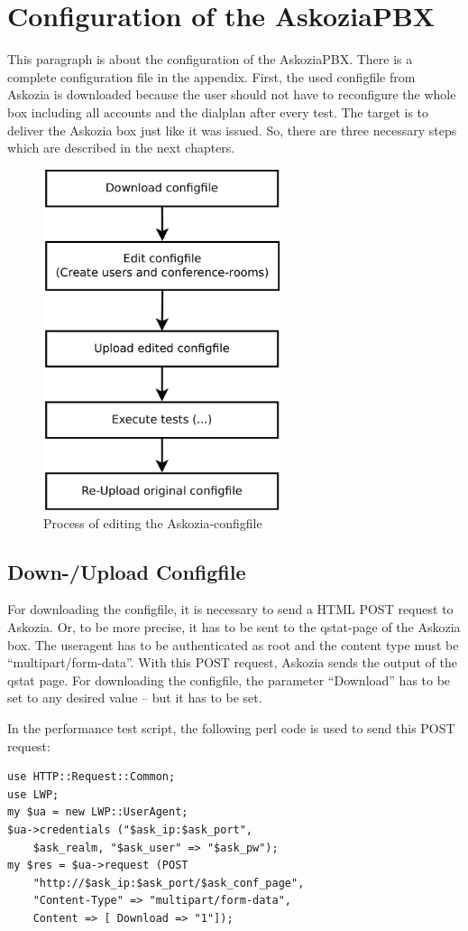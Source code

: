 \section{Configuration of the AskoziaPBX}
\label{sec:configuration}
This paragraph is about the configuration of the AskoziaPBX. There is a complete configuration file in the appendix.
First, the used configfile from Askozia is downloaded because the
user should not have to reconfigure the whole box including all accounts and the dialplan after every test. The target is to deliver
the Askozia box just like it was issued. So, there are three necessary steps which are described in the next chapters.
\begin{figure} [htbp]
\centering
\includegraphics [width=7cm] {config-1}
\caption{Process of editing the Askozia-configfile}
\end{figure}

\subsection{Down-/Upload Configfile}
For downloading the configfile, it is necessary to send a HTML POST request to Askozia. Or, to be more precise, it has to be sent to the qstat-page of the Askozia box. The useragent has to be authenticated as root and the content type must be ``multipart/form-data''. With this POST request, Askozia sends the output of the qstat page. For downloading the configfile, the parameter ``Download'' has to be set to any desired value -- but it has to be set.

In the performance test script, the following perl code is used to send this POST request:
\begin{lstlisting}[breaklines=true,label=code:config-post-request,caption={POST request for downloading configfile} ]
use HTTP::Request::Common;
use LWP;
my $ua = new LWP::UserAgent;
$ua->credentials ("$ask_ip:$ask_port",
	$ask_realm, "$ask_user" => "$ask_pw");
my $res = $ua->request (POST
	"http://$ask_ip:$ask_port/$ask_conf_page",
	"Content-Type" => "multipart/form-data",
	Content => [ Download => "1"]);
\end{lstlisting}

